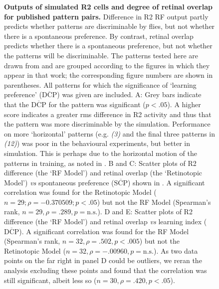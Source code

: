 \begin{figure}[htp]
	\caption{
		{\bf Outputs of simulated R2 cells and degree of retinal overlap for published pattern pairs.}
		Difference in R2 RF output partly predicts whether patterns are discriminable by flies, but not whether there is a spontaneous preference.
		By contrast, retinal overlap predicts whether there is a spontaneous preference, but not whether the patterns will be discriminable.
		The patterns tested here are drawn from \protect\cite{Ernst1999} and are grouped according to the figures in which they appear in that work; the corresponding figure numbers are shown in parentheses.
		All patterns for which the significance of `learning preference' ($\overline{\mathrm{DCP}}$) was given are included.
		A: Grey bars indicate that the $\overline{\mathrm{DCP}}$ for the pattern was significant ($p<.05$).
		A higher score indicates a greater \ac{rms} difference in R2 activity and thus that the pattern was more discriminable by the simulation.
		Performance on more `horizontal' patterns (e.g. \emph{(3)} and the final three patterns in \emph{(12)}) was poor in the behavioural experiments, but better in simulation.
		This is perhaps due to the horizontal motion of the patterns in training, as noted in \protect\cite{Ernst1999}.
		B and C: Scatter plots of R2 difference (the `RF Model') and retinal overlap (the `Retinotopic Model') \emph{vs} spontaneous preference ($\overline{\mathrm{SCP}}$) shown in \protect\cite{Ernst1999}.
		A significant correlation was found for the Retinotopic Model ($n = 29; \rho = -0.370509; p < .05$) but not the RF Model (Spearman's rank, $n=29, \rho=.289, p=\mathrm{n.s.}$).
		D and E: Scatter plots of R2 difference (the `RF Model') and retinal overlap \emph{vs} learning index ($\overline{\mathrm{DCP}}$).
		A significant correlation was found for the RF Model (Spearman's rank, $n=32, \rho=.502, p < .005$) but not the Retinotopic Model ($n=32, \rho=-.00960, p=\mathrm{n.s.}$).
		As two data points on the far right in panel D could be outliers, we reran the analysis excluding these points and found that the correlation was still significant, albeit less so ($n=30, \rho=.420, p < .05$).
		}
	\label{fig:pattern}
\end{figure}

